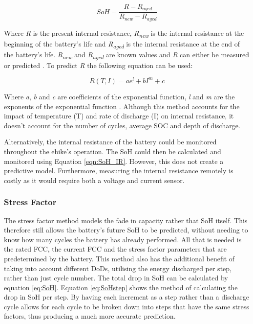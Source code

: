 \documentclass[a4paper, 10pt]{article}
\numberwithin{equation}{section}
\begin{document}
\begin{equation}
    SoH = \frac{R-R_{aged}}{R_{new}-R_{aged}}
\label{eqn:SoH_IR}
\end{equation}

Where \textit{R} is the present internal resistance, \textit{R\textsubscript{new}} is the internal resistance at the beginning of the battery's life and \textit{R\textsubscript{aged}} is the internal resistance at the end of the battery's life. \textit{R\textsubscript{new}} and \textit{R\textsubscript{aged}} are known values and \textit{R} can either be measured or predicted \cite{report:IR_SoH}. To predict \textit{R} the following equation can be used:

\begin{equation}
    R(T,I) = ae^{l} + bI^{m} + c
\end{equation}

Where \textit{a}, \textit{b} and \textit{c} are coefficients of the exponential function, \textit{l} and \textit{m} are the exponents of the exponential function \cite{report:IR_SoH}. Although this method accounts for the impact of temperature (T) and rate of discharge (I) on internal resistance, it doesn't account for the number of cycles, average SOC and depth of discharge.

Alternatively, the internal resistance of the battery could be monitored throughout the ebike's operation. The SoH could then be calculated and monitored using Equation \ref{eqn:SoH_IR}. However, this does not create a predictive model. Furthermore, measuring the internal resistance remotely is costly as it would require both a voltage and current sensor.

\subsubsection{Stress Factor}

The stress factor method models the fade in capacity rather that SoH itself. This therefore still allows the battery's future SoH to be predicted, without needing to know how many cycles the battery has already performed. All that is needed is the rated FCC, the current FCC and the stress factor parameters that are predetermined by the battery. This method also has the additional benefit of taking into account different DoDs, utilising the energy discharged per step, rather than just cycle number. The total drop in SoH can be calculated by equation \ref{eq:SoH}. Equation \ref{eq:SoHstep} shows the method of calculating the drop in SoH per step. By having each increment as a step rather than a discharge cycle allows for each cycle to be broken down into steps that have the same stress factors, thus producing a much more accurate prediction.
\end{document}
